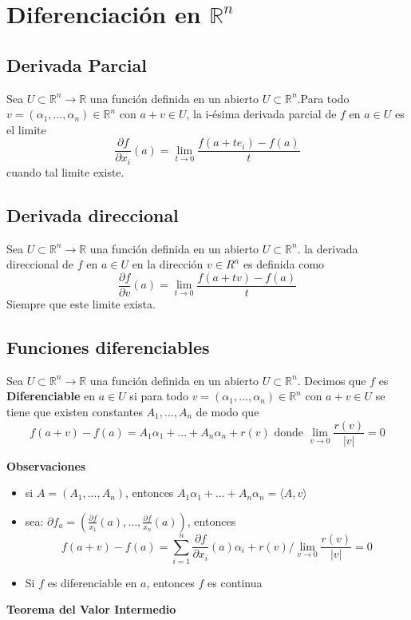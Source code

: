 \documentclass{article}
\newcommand{\R}{\mathbb R}
\begin{document}
\section{Diferenciación en $\R^n$}

\subsection{Derivada Parcial}

Sea $U\subset\R^n\rightarrow\R$ una función definida en un abierto $U\subset\R^n$.Para todo $v=(\alpha_1,...,\alpha_n)\in \R^n$ con $a+v\in U$, la i-ésima derivada parcial de $f$ en $a\in U$  es el limite
\[\frac{\partial f}{\partial x_i}(a)=\lim_{t\rightarrow 0}\frac{f(a+te_i)-f(a)}{t}\] cuando tal limite existe.

\subsection{Derivada direccional}

Sea $U\subset\R^n\rightarrow\R$ una función definida en un abierto $U\subset\R^n$. la derivada direccional de $f$ en $a\in U$ en la dirección $v\in R^n$ es definida como
\[\frac{\partial f}{\partial v}(a)=\lim_{t\rightarrow0}\frac{f(a+tv)-f(a)}{t}\]
Siempre que este limite exista.

\subsection{Funciones diferenciables}

Sea $U\subset\R^n\rightarrow\R$ una función definida en un abierto $U\subset\R^n$. Decimos que $f$ es \textbf{Diferenciable} en $a\in U$ si para todo $v=(\alpha_1,...,\alpha_n)\in \R^n$ con $a+v\in U$ se tiene que existen constantes $A_1,...,A_n$ de modo que 
\[f(a+v)-f(a)=A_1\alpha_1+...+A_n\alpha_n+r(v)\text{ donde } \lim_{v\rightarrow0} \frac{r(v)}{|v|}=0\]

\textbf{Observaciones}
\begin{itemize}
    \item si $A=(A_1,...,A_n)$, entonces $A_1\alpha_1+...+A_n\alpha_n=\langle A,v\rangle$
    \item sea: $\partial f_a=\left(\frac{\partial f}{x_1}(a),...,\frac{\partial f}{x_n}(a)\right)$, entonces
    \[f(a+v)-f(a)=\sum_{i=1}^n\frac{\partial f}{\partial x_i}(a)\alpha_i+r(v)/\lim_{v\rightarrow0} \frac{r(v)}{|v|}=0\]
    \item Si $f$ es diferenciable en $a$, entonces $f$ es continua
\end{itemize}
\noindent\textbf{Teorema del Valor Intermedio}
\end{document}
